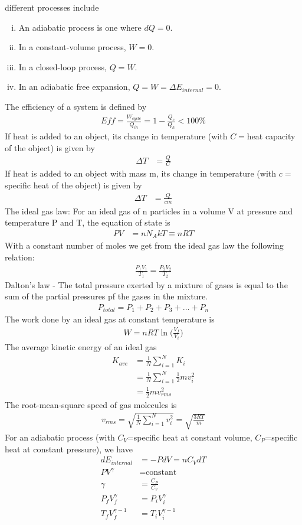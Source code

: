 \begin{multicols}{2}
different processes include
\begin{enumerate}[(i)]
	\item An adiabatic process is one where $dQ=0$.
	\item In a constant-volume process, $W=0$.
	\item In a closed-loop process, $Q=W$.
	\item In an adiabatic free expansion, $Q=W=\Delta E_{internal}=0$.
\end{enumerate}
The efficiency of a system is defined by
\begin{align}
Eff = \frac{W_{cycle}}{Q_{in}}=1-\frac{Q_c}{Q_h}<100\%
\end{align}
If heat is added to an object, its change in temperature (with $C=$heat capacity of the object) is given by 
\begin{align}
\Delta T &= \frac{Q}{C}
\end{align}
If heat is added to an object with mass m, its change in temperature (with $c=$specific heat of the object) is given by 
\begin{align}
\Delta T &= \frac{Q}{cm}
\end{align}
The ideal gas law: For an ideal gas of n particles in a volume V at pressure and temperature P and T, the equation of state is
\begin{align}
PV &=nN_AkT\equiv nRT
\end{align}
With a constant number of moles we get from the ideal gas law the following relation:
\begin{align}
\frac{P_1V_1}{T_1}=\frac{P_2V_2}{T_2}
\end{align}
Dalton's law - The total pressure exerted by a mixture of gases is equal to the sum of the partial pressures pf the gases in the mixture.
\begin{align}
P_{total}=P_1+P_2+P_3+\dots + P_n
\end{align}
The work done by an ideal gas at constant temperature is
\begin{align}
W=nRT\ln\bigg(\frac{V_f}{V_i}\bigg)
\end{align}
The average kinetic energy of an ideal gas
\begin{align}
K_{ave} &=\frac{1}{N}\sum_{i=1}^{N}K_i\\&=\frac{1}{N}\sum_{i=1}^{N}\frac{1}{2}mv_i^2\\&= \frac{1}{2}mv_{rms}^2
\end{align}
The root-mean-square speed of gas molecules is
\begin{align}
v_{rms}=\sqrt{\frac{1}{N}\sum_{i=1}^{N}v_i^2}=\sqrt{\frac{3RT}{m}}
\end{align}
For an adiabatic process (with $C_V$=specific heat at constant volume, $C_P$=specific heat at constant pressure), we have
\begin{align}
dE_{internal} &=-PdV=nC_VdT \\
PV^\gamma &= \textrm{constant} \\
\gamma &= \frac{C_P}{C_V} \\
P_fV_f^\gamma &= P_iV_i^\gamma \\
T_fV_f^{\gamma-1} &= T_iV_i^{\gamma-1}
\end{align}
\end{multicols}
